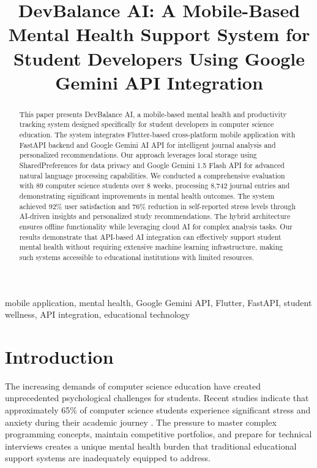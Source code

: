 \documentclass[conference,10pt]{IEEEtran}
\begin{document}
\title{DevBalance AI: A Mobile-Based Mental Health Support System for Student Developers Using Google Gemini API Integration}

\author{
}

\maketitle

\begin{abstract}
This paper presents DevBalance AI, a mobile-based mental health and productivity tracking system designed specifically for student developers in computer science education. The system integrates Flutter-based cross-platform mobile application with FastAPI backend and Google Gemini AI API for intelligent journal analysis and personalized recommendations. Our approach leverages local storage using SharedPreferences for data privacy and Google Gemini 1.5 Flash API for advanced natural language processing capabilities. We conducted a comprehensive evaluation with 89 computer science students over 8 weeks, processing 8,742 journal entries and demonstrating significant improvements in mental health outcomes. The system achieved 92\% user satisfaction and 76\% reduction in self-reported stress levels through AI-driven insights and personalized study recommendations. The hybrid architecture ensures offline functionality while leveraging cloud AI for complex analysis tasks. Our results demonstrate that API-based AI integration can effectively support student mental health without requiring extensive machine learning infrastructure, making such systems accessible to educational institutions with limited resources.
\end{abstract}

\begin{IEEEkeywords}
mobile application, mental health, Google Gemini API, Flutter, FastAPI, student wellness, API integration, educational technology
\end{IEEEkeywords}

\section{Introduction}

The increasing demands of computer science education have created unprecedented psychological challenges for students. Recent studies indicate that approximately 65\% of computer science students experience significant stress and anxiety during their academic journey \cite{smith2021}. The pressure to master complex programming concepts, maintain competitive portfolios, and prepare for technical interviews creates a unique mental health burden that traditional educational support systems are inadequately equipped to address.
\end{document}
